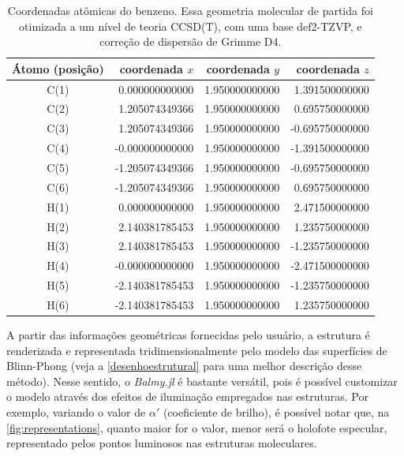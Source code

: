 \begin{table}[htb]
	\centering
	\caption{\label{tab:coords} Coordenadas atômicas do benzeno. Essa geometria molecular de partida foi otimizada a um nível de teoria CCSD(T), com uma base def2-TZVP, e correção de dispersão de Grimme D4.}	
	\begin{tabular}{crrr}
		\toprule
		\textbf{Átomo (posição)} & coordenada $x$ & coordenada $y$ & coordenada $z$
		\\ 
		\midrule
C(1)  &    0.000000000000  &   1.950000000000  &   1.391500000000  \\
C(2)  &    1.205074349366  &   1.950000000000  &   0.695750000000  \\
C(3)  &    1.205074349366  &   1.950000000000  &  -0.695750000000  \\
C(4)  &   -0.000000000000  &   1.950000000000  &  -1.391500000000  \\
C(5)  &   -1.205074349366  &   1.950000000000  &  -0.695750000000  \\
C(6)  &   -1.205074349366  &   1.950000000000  &   0.695750000000  \\
H(1)  &    0.000000000000  &   1.950000000000  &   2.471500000000  \\
H(2)  &    2.140381785453  &   1.950000000000  &   1.235750000000  \\
H(3)  &    2.140381785453  &   1.950000000000  &  -1.235750000000  \\
H(4)  &   -0.000000000000  &   1.950000000000  &  -2.471500000000  \\
H(5)  &   -2.140381785453  &   1.950000000000  &  -1.235750000000  \\
H(6)  &   -2.140381785453  &   1.950000000000  &   1.235750000000  \\
    \bottomrule
	\end{tabular}
\end{table}

A partir das informações geométricas fornecidas pelo usuário, a estrutura é renderizada e representada tridimensionalmente pelo modelo das superfícies de Blinn-Phong (veja a \autoref{desenhoestrutural} para uma melhor descrição desse método). Nesse sentido, o \textit{Balmy.jl} é bastante versátil, pois é possível customizar o modelo através dos efeitos de iluminação empregados nas estruturas. Por exemplo, variando o valor de $\alpha'$ (coeficiente de brilho), é possível notar que, na \autoref{fig:representations}, quanto maior for o valor, menor será o holofote especular, representado pelos pontos luminosos nas estruturas moleculares.

